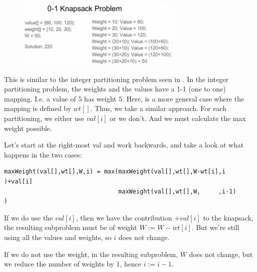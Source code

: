 \begin{figure}
\centering
\includegraphics[width=0.7\textwidth]{Images/figGFGDPSet10Knapsack}
\end{figure}

\textbf{}

\RayNotesBegin

This is similar to the integer partitioning problem seen in
. In the integer partitioning problem, the
weights and the values have a 1-1 (one to one) mapping. I.e. a value of $5$
has weight $5$. Here, is a more general case where the mapping is defined by
$wt[]$. Thus, we take a similar approach. For each partitioning, we either
use $val[i]$ or we don't. And we must calculate the max weight possible.

Let's start at the right-most val and work backwards, and take a look at
what happens in the two cases:
\begin{lstlisting}[style=raygeneric]
maxWeight(val[],wt[],W,i) = max(maxWeight(val[],wt[],W-wt[i],i  )+val[i]
                                maxWeight(val[],wt[],W,     ,i-1)       )
\end{lstlisting}
If we do use the $val[i]$, then we have the contribution $+val[i]$ to the
knapsack, the resulting subproblem must be of weight $W:=W-wt[i]$. But we're
still using all the values and weights, so $i$ does not change.

If we do not use the weight, in the resulting subproblem, $W$ does not
change, but we reduce the number of weights by 1, hence $i:=i-1$.


